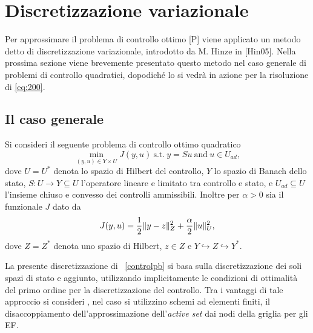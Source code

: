 \section{Discretizzazione variazionale}
\label{chap:DiscVar}
Per approssimare il problema di controllo ottimo [P] viene applicato un metodo detto di discretizzazione variazionale, introdotto da M. Hinze in [Hin05]. Nella prossima sezione viene brevemente presentato questo metodo nel caso generale di problemi di controllo quadratici, dopodiché lo si vedrà in azione per  la risoluzione di \ref{eq:200}.   


\subsection{Il caso generale}

Si consideri il seguente problema di controllo ottimo quadratico
\begin{equation}
\label{controlpb}
\min_{(y,u)\in Y\times U} J(y,u)   \ \text{s.t.} \ y=Su \  \text{and} \ u\in U_{ad},
\end{equation}
dove $ U=U^*$ denota lo spazio di Hilbert del controllo, $ Y $ lo spazio di Banach dello stato, $ S:U\to Y\subseteq U $ l'operatore lineare e limitato tra controllo e stato, e $ U_{ad}\subseteq U $ l'insieme chiuso e convesso dei controlli ammissibili. Inoltre per $ \alpha>0 $ sia il funzionale $ J $ dato da 
\begin{equation}
J(y,u)=\frac{1}{2}\lVert y-z\rVert^2_Z + \frac{\alpha}{2}\lVert u\rVert^2_U,
\end{equation}
dove $ Z=Z^* $ denota uno spazio di Hilbert, $ z\in Z $ e $ Y\hookrightarrow Z\hookrightarrow Y^* $.   

La presente  discretizzazione di ~\eqref{controlpb} si basa sulla discretizzazione dei soli spazi di stato e aggiunto, utilizzando implicitamente le condizioni di ottimalità del primo ordine per la discretizzazione del controllo. Tra i vantaggi di tale approccio si consideri , nel caso si utilizzino schemi ad elementi finiti,  il disaccoppiamento dell'approssimazione dell'\textit{active set} dai nodi della griglia per gli EF. 


